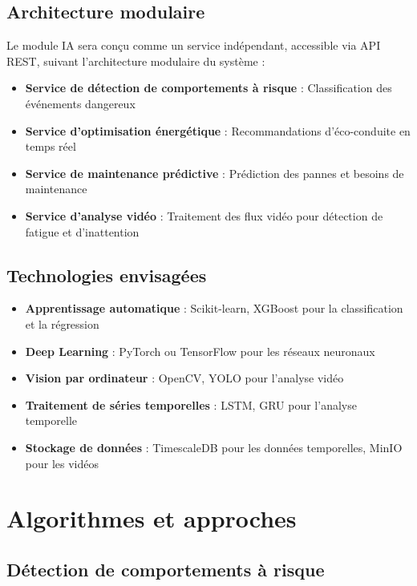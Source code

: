 \documentclass[a4paper, 12pt]{book}
\begin{document}
\subsection{Architecture modulaire}

Le module IA sera conçu comme un service indépendant, accessible via API REST, suivant l'architecture modulaire du système :

\begin{itemize}
    \item \textbf{Service de détection de comportements à risque} : Classification des événements dangereux
    \item \textbf{Service d'optimisation énergétique} : Recommandations d'éco-conduite en temps réel
    \item \textbf{Service de maintenance prédictive} : Prédiction des pannes et besoins de maintenance
    \item \textbf{Service d'analyse vidéo} : Traitement des flux vidéo pour détection de fatigue et d'inattention
\end{itemize}

\subsection{Technologies envisagées}

\begin{itemize}
    \item \textbf{Apprentissage automatique} : Scikit-learn, XGBoost pour la classification et la régression
    \item \textbf{Deep Learning} : PyTorch ou TensorFlow pour les réseaux neuronaux
    \item \textbf{Vision par ordinateur} : OpenCV, YOLO pour l'analyse vidéo
    \item \textbf{Traitement de séries temporelles} : LSTM, GRU pour l'analyse temporelle
    \item \textbf{Stockage de données} : TimescaleDB pour les données temporelles, MinIO pour les vidéos
\end{itemize}

\section{Algorithmes et approches}

\subsection{Détection de comportements à risque}
\end{document}
